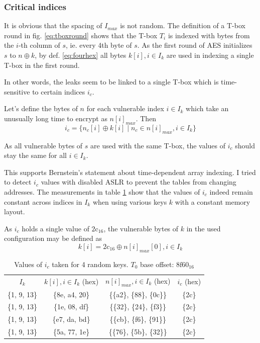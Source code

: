 \documentclass[thesis=B,english]{FITthesis}[2019/03/06]
\begin{document}
\subsubsection{Critical indices}
\label{section:crit_indices}
It is obvious that the spacing of $I_{max}$ is not random. The definition of a T-box round in fig. \ref{eq:tboxround} shows that the T-box $T_i$ is indexed with bytes from the $i$-th column of $s$, ie. every 4th byte of $s$.
As the first round of AES initializes $s$ to $n \oplus k$, by def. \ref{eq:fourhex} all bytes $k[i], i \in I_k$ are used in indexing a single T-box in the first round. 

In other words, the leaks seem to be linked to a single T-box which is time-sensitive to certain indices $i_c$.

Let's define the bytes of $n$ for each vulnerable index $i \in I_k$ which take an unusually long time to encrypt as $n[i]_{max}$. Then
$$
i_c = \{ n_c[i] \oplus k[i] \mid n_c \in n[i]_{max}, i \in I_k \}
$$

As all vulnerable bytes of $s$ are used with the same T-box, the values of $i_c$ should stay the same for all $i \in I_k$.

This supports Bernstein's statement about time-dependent array indexing.
I tried to detect $i_c$ values with disabled ASLR to prevent the tables from changing addresses.
The measurements in table \ref{tbl:tbox_indices} show that the values of $i_c$ indeed remain constant across indices in $I_k$ when using various keys $k$ with a constant memory layout.

As $i_c$ holds a single value of $\text{2c}_{16}$, the vulnerable bytes of $k$ in the used configuration may be defined as
$$
k[i] = \text{2c}_{16} \oplus n[i]_{max}[0], i \in I_k
$$

\begin{table}
	\centering
	\begin{tabular}{c|c|c|c}
		$I_k$ & $k[i], i \in I_k$ (hex) & $n[i]_{max}, i \in I_k$ (hex) & $i_c$ (hex) \\
		\{1, 9, 13\} & \{8e, a4, 20\} & \{\{a2\}, \{88\}, \{0c\}\} & \{2c\} \\
		\{1, 9, 13\} & \{1e, 08, df\} & \{\{32\}, \{24\}, \{f3\}\} & \{2c\} \\
		\{1, 9, 13\} & \{e7, da, bd\} & \{\{cb\}, \{f6\}, \{91\}\} & \{2c\} \\
		\{1, 9, 13\} & \{5a, 77, 1e\} & \{\{76\}, \{5b\}, \{32\}\} & \{2c\} \\
	\end{tabular}
	\caption{Values of $i_c$ taken for 4 random keys. $T_0$ base offset: $\text{8f60}_{16}$}
	\label{tbl:tbox_indices}
\end{table}
\end{document}

